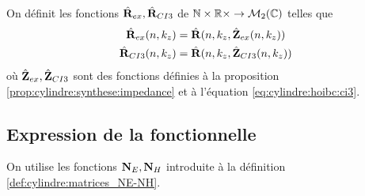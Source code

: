   \begin{defn}%
    \label{def:cylindre:minimisation:matrices_MR}
    On définit les fonctions \(\hat{\mathbf{R}}_{ex}, \hat{\mathbf{R}}_{CI3}\) de \(\mathbb N\times\mathbb R\times \rightarrow \mathcal{M}_2(\mathbb C)\) telles que
    \begin{align*}
      \hat{\mathbf{R}}_{ex}(n,k_z) &= \hat{\mathbf{R}}(n,k_z, \hat{\mathbf{Z}}_{ex}(n,k_z))
      \\
      \hat{\mathbf{R}}_{CI3}(n,k_z) &= \hat{\mathbf{R}}(n,k_z, \hat{\mathbf{Z}}_{CI3}(n,k_z))
    \end{align*}
    où \(\hat{\mathbf{Z}}_{ex},\hat{\mathbf{Z}}_{CI3}\) sont des fonctions définies à la proposition \ref{prop:cylindre:synthese:impedance} et à l'équation \eqref{eq:cylindre:hoibc:ci3}.
  \end{defn}

  \subsection{Expression de la fonctionnelle}

    On utilise les fonctions \(\mathbf{N}_E, \mathbf{N}_H\) introduite à la définition \ref{def:cylindre:matrices_NE-NH}.

